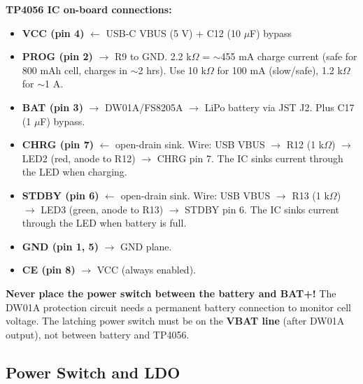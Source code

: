 \documentclass[a4paper,11pt]{article}
\renewcommand*{\,}{ }%
\begin{document}
\begin{infobox}
\textbf{TP4056 IC on-board connections:}
\begin{itemize}[noitemsep]
  \item \textbf{VCC (pin 4)} $\leftarrow$ USB-C VBUS (5\,V) + C12 (10\,$\mu$F) bypass
  \item \textbf{PROG (pin 2)} $\rightarrow$ R9 to GND. 2.2\,k$\Omega$ = $\sim$455\,mA charge current (safe for 800\,mAh cell, charges in $\sim$2\,hrs). Use 10\,k$\Omega$ for 100\,mA (slow/safe), 1.2\,k$\Omega$ for $\sim$1\,A.
  \item \textbf{BAT (pin 3)} $\rightarrow$ DW01A/FS8205A $\rightarrow$ LiPo battery via JST J2. Plus C17 (1\,$\mu$F) bypass.
  \item \textbf{CHRG (pin 7)} $\leftarrow$ open-drain sink. Wire: USB VBUS $\rightarrow$ R12 (1\,k$\Omega$) $\rightarrow$ LED2 (red, anode to R12) $\rightarrow$ CHRG pin 7. The IC sinks current through the LED when charging.
  \item \textbf{STDBY (pin 6)} $\leftarrow$ open-drain sink. Wire: USB VBUS $\rightarrow$ R13 (1\,k$\Omega$) $\rightarrow$ LED3 (green, anode to R13) $\rightarrow$ STDBY pin 6. The IC sinks current through the LED when battery is full.
  \item \textbf{GND (pin 1, 5)} $\rightarrow$ GND plane.
  \item \textbf{CE (pin 8)} $\rightarrow$ VCC (always enabled).
\end{itemize}
\end{infobox}

\begin{warningbox}
\textbf{Never place the power switch between the battery and BAT+!} The DW01A protection circuit needs a permanent battery connection to monitor cell voltage. The latching power switch must be on the \textbf{VBAT line} (after DW01A output), not between battery and TP4056.
\end{warningbox}

\subsection{Power Switch and LDO}
\end{document}
